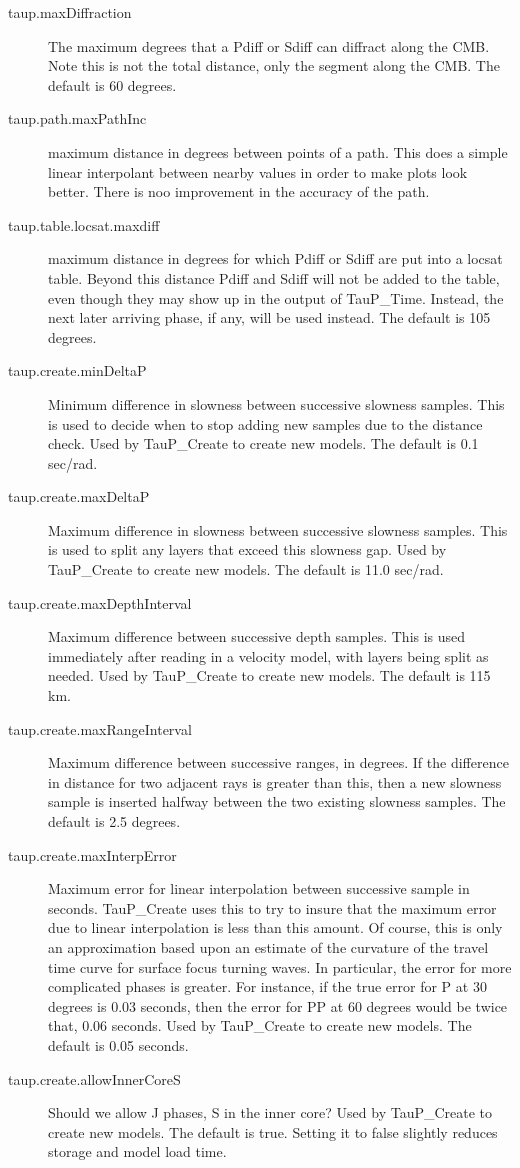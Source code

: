 \begin{description}
\item[taup.maxDiffraction] The maximum degrees that a Pdiff or Sdiff can diffract along the CMB.
 Note this is not the total distance, only the segment along the CMB. The default is 60 degrees.
\item[taup.path.maxPathInc] maximum distance in degrees between points of a path. This does a simple linear interpolant between nearby values in order to make plots look better. There is noo improvement in the accuracy of the path.
\item[taup.table.locsat.maxdiff] maximum distance in degrees for which Pdiff
or Sdiff are put into a locsat table. Beyond this distance Pdiff and Sdiff will
not be added to the table, even though they may show up in the output of
TauP\_Time. Instead, the next later arriving phase, if any, will be used
instead. The default is 105 degrees.
\item[taup.create.minDeltaP] Minimum difference in slowness between
successive slowness samples. This is used to decide when to stop adding new
samples due to the distance check.
Used by TauP\_Create to create new models.
The default is 0.1 sec/rad.
\item[taup.create.maxDeltaP] Maximum difference in slowness between
successive slowness samples. This is used to split any layers that exceed
this slowness gap.
Used by TauP\_Create to create new models.
 The default is 11.0 sec/rad.
\item[taup.create.maxDepthInterval] Maximum difference between successive depth
samples. This is used immediately after reading in a velocity model, with
layers being split as needed.
Used by TauP\_Create to create new models.
 The default is 115 km.
\item[taup.create.maxRangeInterval] Maximum difference between successive
ranges, in degrees. If the difference in distance for two adjacent rays
is greater than this, then a new slowness sample is inserted halfway between
the two existing slowness samples.
The default is 2.5 degrees.
\item[taup.create.maxInterpError] Maximum error for linear interpolation
 between successive sample in seconds. TauP\_Create uses this to try to insure
that the maximum error due to linear interpolation is less than this amount.
Of course, this is only an approximation based upon an estimate of the
 curvature of the travel time curve for surface focus turning waves.
In particular, the error for more complicated phases is greater. For instance,
if the true error for P at 30 degrees is 0.03 seconds, then the error for
PP at 60 degrees would be twice that, 0.06 seconds.
Used by TauP\_Create to create new models. The default is 0.05 seconds.
\item[taup.create.allowInnerCoreS] Should we allow J phases, S in
the inner core?
Used by TauP\_Create to create new models.
 The default is true. Setting it to false slightly reduces storage and model
load time.
\end{description}

